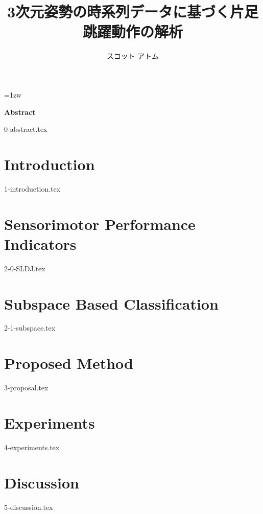\documentclass[a4paper,11pt]{report}
\title{3次元姿勢の時系列データに基づく片足跳躍動作の解析}
\author{スコット アトム}
\begin{document}
\maketitle
\thispagestyle{empty}
\newpage

\thispagestyle{empty}
\vspace*{20pt plus 1fil}
\parindent=1zw
\noindent
\begin{center}
{\Large \bf Abstract}
\vspace{2cm}
\end{center}

{0-abstract.tex}
\par
\vspace{0pt plus 1fil}
\newpage

\tableofcontents
\listoffigures
\listoftables

\pagebreak \setcounter{page}{1}

\chapter{Introduction}
{1-introduction.tex}

\chapter{Sensorimotor Performance Indicators}
{2-0-SLDJ.tex}

\chapter{Subspace Based Classification}
{2-1-subspace.tex}

\chapter{Proposed Method}
{3-proposal.tex}

\chapter{Experiments}
{4-experiments.tex}

\chapter{Discussion}
{5-discussion.tex}
\end{document}
